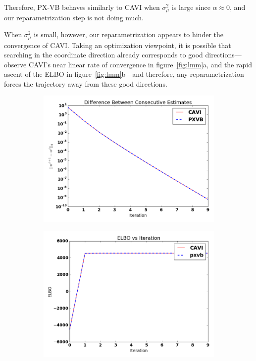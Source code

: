 \documentclass{article}
\begin{document}
Therefore, PX-VB behaves similarly to CAVI when $\sigma_\mu^2$ is large since $\alpha \approx 0$, and our reparametrization step is not doing much. 

When $\sigma_\mu^2$ is small, however, our reparametrization appears to hinder the convergence of CAVI. Taking an optimization viewpoint, it is possible that searching in the coordinate direction already corresponds to good directions---observe CAVI's near linear rate of convergence in figure~\ref{fig:lmm}a, and the rapid ascent of the ELBO in figure~\ref{fig:lmm}b---and therefore, any reparametrization forces the trajectory away from these good directions. 



\begin{figure}[tb]
    \begin{subfigure}[t]{0.49\textwidth}
        \includegraphics[width=\textwidth]{LMM/pw_lmm_bigvar.png}
        \subcaption{}
    \end{subfigure}
          \begin{subfigure}[t]{0.49\textwidth}
        \includegraphics[width=\textwidth]{LMM/elbo_lmm_bigvar.png}

\end{subfigure}
\end{figure}
\end{document}
